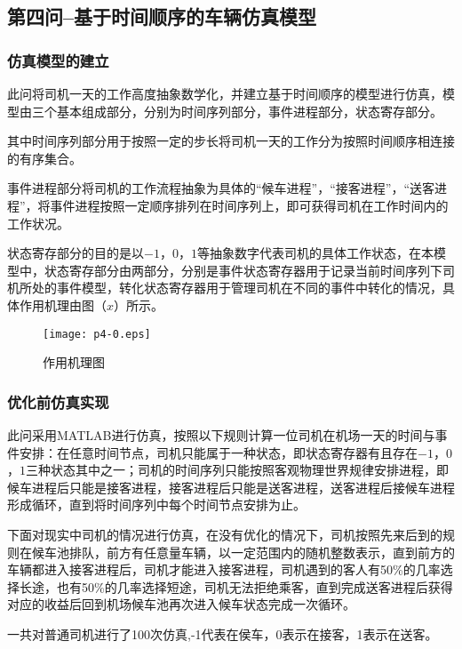 \documentclass[withoutpreface,bwprint]{cumcmthesis} %
\begin{document}
\subsection{第四问--基于时间顺序的车辆仿真模型}

\subsubsection{仿真模型的建立}
此问将司机一天的工作高度抽象数学化，并建立基于时间顺序的模型进行仿真，模型由三个基本组成部分，分别为时间序列部分，事件进程部分，状态寄存部分。

其中时间序列部分用于按照一定的步长将司机一天的工作分为按照时间顺序相连接的有序集合。

事件进程部分将司机的工作流程抽象为具体的“候车进程”，“接客进程”，“送客进程”，将事件进程按照一定顺序排列在时间序列上，即可获得司机在工作时间内的工作状况。

状态寄存部分的目的是以$-1$，$0$，$1$等抽象数字代表司机的具体工作状态，在本模型中，状态寄存部分由两部分，分别是事件状态寄存器用于记录当前时间序列下司机所处的事件模型，转化状态寄存器用于管理司机在不同的事件中转化的情况，具体作用机理由图$（x）$所示。


 \begin{figure}[H]
  	\centering
	\texttt{[image: p4-0.eps]}
  	\caption{作用机理图}
  \end{figure}

\subsubsection{优化前仿真实现}

此问采用MATLAB进行仿真，按照以下规则计算一位司机在机场一天的时间与事件安排：在任意时间节点，司机只能属于一种状态，即状态寄存器有且存在$-1$，$0$，$1$三种状态其中之一；司机的时间序列只能按照客观物理世界规律安排进程，即候车进程后只能是接客进程，接客进程后只能是送客进程，送客进程后接候车进程形成循环，直到将时间序列中每个时间节点安排为止。

下面对现实中司机的情况进行仿真，在没有优化的情况下，司机按照先来后到的规则在候车池排队，前方有任意量车辆，以一定范围内的随机整数表示，直到前方的车辆都进入接客进程后，司机才能进入接客进程，司机遇到的客人有50\%的几率选择长途，也有50\%的几率选择短途，司机无法拒绝乘客，直到完成送客进程后获得对应的收益后回到机场候车池再次进入候车状态完成一次循环。

一共对普通司机进行了100次仿真,-1代表在侯车，0表示在接客，1表示在送客。
\end{document}

